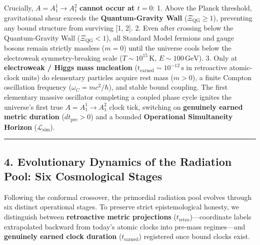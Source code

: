 \documentclass[
]{article}
\begin{document}
Crucially, \(A = A_1^1 \to A_1^2\) \textbf{cannot occur at \(t = 0\)}:
1. Above the Planck threshold, gravitational shear exceeds the
\textbf{Quantum-Gravity Wall} (\(\Xi_{\mathrm{QG}} \ge 1\)), preventing
any bound structure from surviving {[}1, 2{]}. 2. Even after crossing
below the Quantum-Gravity Wall (\(\Xi_{\mathrm{QG}} < 1\)), all Standard
Model fermions and gauge bosons remain strictly massless (\(m = 0\))
until the universe cools below the electroweak symmetry-breaking scale
(\(T \sim 10^{15}\,\mathrm{K}\), \(E \sim 100\,\mathrm{GeV}\)). 3. Only
at \textbf{electroweak / Higgs mass nucleation}
(\(t_{\mathrm{earned}} \sim 10^{-12}\,\mathrm{s}\) in retroactive
atomic-clock units) do elementary particles acquire rest mass
(\(m > 0\)), a finite Compton oscillation frequency
(\(\omega_C = mc^2/\hbar\)), and stable bound coupling. The first
elementary massive oscillator completing a coupled phase cycle ignites
the universe's first true \(A = A_1^1 \to A_1^2\) clock tick, switching
on \textbf{genuinely earned metric duration} (\(dt_{\mathrm{pre}} > 0\))
and a bounded \textbf{Operational Simultaneity Horizon}
(\(\mathcal{L}_{\mathrm{sim}}\)).

\begin{center}\rule{0.5\linewidth}{0.5pt}\end{center}

\subsection{4. Evolutionary Dynamics of the Radiation Pool: Six
Cosmological
Stages}\label{evolutionary-dynamics-of-the-radiation-pool-six-cosmological-stages}

Following the conformal crossover, the primordial radiation pool evolves
through six distinct operational stages. To preserve strict
epistemological honesty, we distinguish between \textbf{retroactive
metric projections} (\(t_{\mathrm{retro}}\))---coordinate labels
extrapolated backward from today's atomic clocks into pre-mass
regimes---and \textbf{genuinely earned clock duration}
(\(t_{\mathrm{earned}}\)) registered once bound clocks exist.
\end{document}
